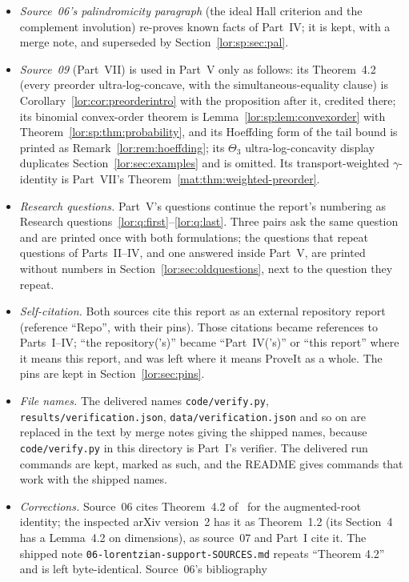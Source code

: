\documentclass[11pt]{article}
\numberwithin{equation}{section}
\theoremstyle{definition}
\begin{document}
\begin{itemize}[leftmargin=1.4em]
\item \emph{Source~06's palindromicity paragraph} (the ideal Hall criterion
and the complement involution) re-proves known facts of Part~IV; it is kept,
with a merge note, and superseded by Section~\ref{lor:sp:sec:pal}.
\item \emph{Source~09} (Part~VII) is used in Part~V only as follows: its
Theorem~4.2 (every preorder ultra-log-concave, with the simultaneous-equality
clause) is Corollary~\ref{lor:cor:preorderintro} with the proposition after
it, credited there; its binomial convex-order theorem is
Lemma~\ref{lor:sp:lem:convexorder} with Theorem~\ref{lor:sp:thm:probability},
and its Hoeffding form of the tail bound is printed as
Remark~\ref{lor:rem:hoeffding}; its $\Theta_3$ ultra-log-concavity display
duplicates Section~\ref{lor:sec:examples} and is omitted. Its
transport-weighted $\gamma$-identity is Part~VII's
Theorem~\ref{mat:thm:weighted-preorder}.
\item \emph{Research questions.} Part~V's questions continue the report's
numbering as Research questions~\ref{lor:q:first}--\ref{lor:q:last}. Three
pairs ask the same question and are printed once with both formulations;
the questions that repeat questions of Parts~II--IV, and one answered inside
Part~V, are printed without numbers in
Section~\ref{lor:sec:oldquestions}, next to the question they repeat.
\item \emph{Self-citation.} Both sources cite this report as an external
repository report (reference ``Repo'', with their pins). Those citations
became references to Parts~I--IV; ``the repository('s)'' became ``Part~IV('s)''
or ``this report'' where it means this report, and was left where it means
ProveIt as a whole. The pins are kept in Section~\ref{lor:sec:pins}.
\item \emph{File names.} The delivered names \nolinkurl{code/verify.py},
\nolinkurl{results/verification.json}, \nolinkurl{data/verification.json}
and so on are replaced in the text by merge notes giving the shipped names,
because \texttt{code/verify.py} in this directory is Part~I's verifier. The
delivered run commands are kept, marked as such, and the README gives
commands that work with the shipped names.
\item \emph{Corrections.} Source~06 cites Theorem~4.2 of~\cite{DHLTW} for the
augmented-root identity; the inspected arXiv version~2 has it as
Theorem~1.2 (its Section~4 has a Lemma~4.2 on dimensions), as source~07 and
Part~I cite it. The shipped note \texttt{06-lorentzian-support-SOURCES.md}
repeats ``Theorem 4.2'' and is left byte-identical. Source~06's bibliography

\end{itemize}
\end{document}
